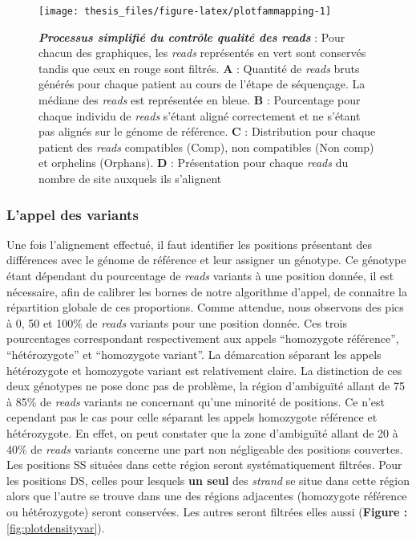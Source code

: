 \documentclass[12pt,twoside]{ugathesis}
\begin{document}
\begin{figure}

{\centering \texttt{[image: thesis\_files/figure-latex/plotfammapping-1]} 

}

\caption[Processus simplifié du contrôle qualité des
\emph{reads}\\]{\textbf{\emph{Processus simplifié du contrôle
qualité des \emph{reads}}} : Pour chacun des graphiques, les
\emph{reads} représentés en vert sont conservés tandis que ceux en rouge
sont filtrés. \textbf{A} : Quantité de \emph{reads} bruts générés pour
chaque patient au cours de l'étape de séquençage. La médiane des
\emph{reads} est représentée en bleue. \textbf{B} : Pourcentage pour
chaque individu de \emph{reads} s'étant aligné correctement et ne
s'étant pas alignés sur le génome de référence. \textbf{C} :
Distribution pour chaque patient des \emph{reads} compatibles (Comp),
non compatibles (Non comp) et orphelins (Orphans). \textbf{D} :
Présentation pour chaque \emph{reads} du nombre de site auxquels ils
s'alignent}\label{fig:plotfammapping}
\end{figure}
















\newpage

\subsubsection{L'appel des variants}\label{lappel-des-variants-1}

Une fois l'alignement effectué, il faut identifier les positions
présentant des différences avec le génome de référence et leur assigner
un génotype. Ce génotype étant dépendant du pourcentage de \emph{reads}
variants à une position donnée, il est nécessaire, afin de calibrer les
bornes de notre algorithme d'appel, de connaitre la répartition globale
de ces proportions. Comme attendue, nous observons des pics à 0, 50 et
100\% de \emph{reads} variants pour une position donnée. Ces trois
pourcentages correspondant respectivement aux appels ``homozygote
référence'', ``hétérozygote'' et ``homozygote variant''. La démarcation
séparant les appels hétérozygote et homozygote variant est relativement
claire. La distinction de ces deux génotypes ne pose donc pas de
problème, la région d'ambiguïté allant de 75 à 85\% de \emph{reads}
variants ne concernant qu'une minorité de positions. Ce n'est cependant
pas le cas pour celle séparant les appels homozygote référence et
hétérozygote. En effet, on peut constater que la zone d'ambiguïté allant
de 20 à 40\% de \emph{reads} variants concerne une part non négligeable
des positions couvertes. Les positions SS situées dans cette région
seront systématiquement filtrées. Pour les positions DS, celles pour
lesquels \textbf{un seul} des \emph{strand} se situe dans cette région
alors que l'autre se trouve dans une des régions adjacentes (homozygote
référence ou hétérozygote) seront conservées. Les autres seront filtrées
elles aussi (\textbf{Figure : }\ref{fig:plotdensityvar}).
\end{document}
